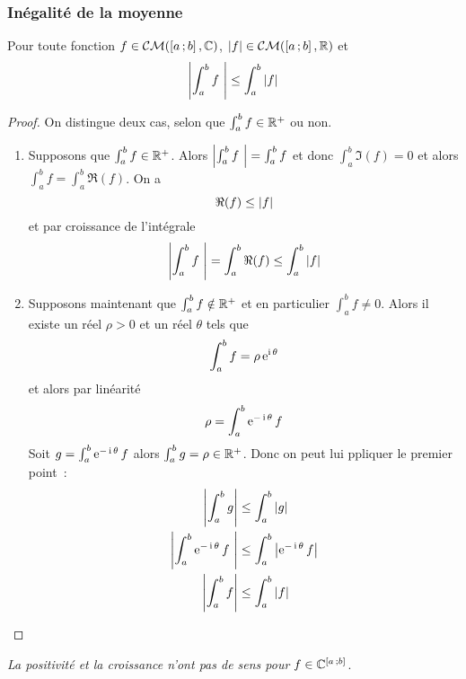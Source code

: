 \subsubsection{Inégalité de la moyenne}

\begin{theo}
  Pour toute fonction $f \in \mathcal{CM}(\left[ a \, ;  b \right],\mathbb{C})$, $\left\lvert f\right\rvert \in \mathcal{CM}(\left[ a \, ;  b \right],\mathbb{R})$ et
  \begin{equation}
    \left\lvert\int_a^b f~\right\rvert \leq \int_a^b \left\lvert f\right\rvert
  \end{equation}
\end{theo}
\begin{proof}
  On distingue deux cas, selon que $\int_a^b f \in \mathbb{R}^{+}$ ou non.
  \begin{enumerate}
  \item Supposons que $\int_a^b f \in \mathbb{R}^{+}$. Alors $\left\lvert\int_a^b f~\right\rvert=\int_a^b f$ et donc $\int_a^b \Im(f) =0$ et alors $\int_a^b f = \int_a^b \Re(f)$. On a
    \begin{equation}
      \Re(f) \leq \left\lvert f\right\rvert
    \end{equation}
    et par croissance de l'intégrale
    \begin{equation}
      \left\lvert\int_a^b f~\right\rvert = \int_a^b \Re(f) \leq \int_a^b \left\lvert f\right\rvert
    \end{equation}
  \item Supposons maintenant que $\int_a^b f \notin \mathbb{R}^{+}$ et en particulier $\int_a^b f \neq 0$. Alors il existe un réel $\rho >0$ et un réel $\theta$ tels que
    \begin{equation}
      \int_a^b f = \rho \operatorname{e}^{\operatorname{i} \theta}
    \end{equation}
    et alors par linéarité
    \begin{equation}
      \rho = \int_a^b \operatorname{e}^{-\operatorname{i} \theta}f
    \end{equation}
    Soit $g=\int_a^b \operatorname{e}^{-\operatorname{i} \theta}f$ alors $\int_a^b g=\rho \in \mathbb{R}^{+}$. Donc on peut lui ppliquer le premier point~:
    \begin{align}
      \left\lvert\int_a^b g\right\rvert &\leq \int_a^b \left\lvert g\right\rvert \\
      \left\lvert\int_a^b \operatorname{e}^{-\operatorname{i} \theta} f~\right\rvert &\leq \int_a^b \left\lvert\operatorname{e}^{-\operatorname{i} \theta} f\right\rvert \\
      \left\lvert\int_a^b f\right\rvert &\leq \int_a^b \left\lvert f\right\rvert \\
    \end{align}
  \end{enumerate}
\end{proof}

\danger \emph{La positivité et la croissance n'ont pas de sens pour $f \in \mathbb{C}^{\left[ a \, ;  b \right]}$}.